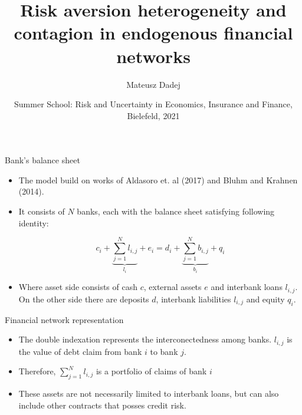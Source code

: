 \documentclass{beamer}
\title{Risk aversion heterogeneity and contagion in
endogenous financial networks}
\author{Mateusz Dadej}
\institute{University of Brescia}
\date[VLC 2023] %
{Summer School: Risk and Uncertainty in Economics, Insurance and Finance, Bielefeld, 2021}
\begin{document}
\begin{frame}
\titlepage
\end{frame}

\begin{frame}{Bank's balance sheet}

    \begin{itemize}
        \item The model build on works of Aldasoro et. al (2017) and Bluhm and Krahnen (2014). %
        \item It consists of $N$ banks, each with the balance sheet satisfying following identity:
        
        \[c_i + \underbrace{\sum_{j=1}^{N}l_{i,j}}_{l_i} + e_i = d_i + \underbrace{\sum_{j=1}^{N}b_{i,j}}_{b_i} + q_i\]

        \item Where asset side consists of cash $c$, external assets $e$ and interbank loans $l_{i,j}$. On the other side there are deposits $d$, interbank liabilities $l_{i,j}$ and equity $q_i$.
        
    \end{itemize}

\end{frame}

\begin{frame}{Financial network representation}

    \begin{itemize}
        \item The double indexation represents the interconectedness among banks. $l_{i,j}$ is the value of debt claim from bank $i$ to bank $j$.
        \item Therefore, $\sum_{j=1}^{N}l_{i,j}$ is a portfolio of claims of bank $i$
        \item These assets are not necessarily limited to interbank loans, but can also include other contracts that posses credit risk.
    \end{itemize}   

\end{frame}
\end{document}
